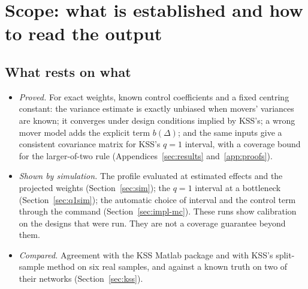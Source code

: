 \section{Scope: what is established and how to read the output}\label{sec:scope}

\subsection{What rests on what}
\begin{itemize}
\item \emph{Proved.} For exact weights, known control coefficients and a fixed centring
constant: the variance estimate is exactly unbiased when movers' variances are known;
it converges under design conditions implied by KSS's; a wrong mover model adds the
explicit term $b(\Delta)$; and the same inputs give a consistent covariance matrix for
KSS's $q=1$ interval, with a coverage bound for the larger-of-two rule
(Appendices~\ref{sec:results} and~\ref{app:proofs}).
\item \emph{Shown by simulation.} The profile evaluated at estimated effects and the
projected weights (Section~\ref{sec:sim}); the $q=1$ interval at a bottleneck
(Section~\ref{sec:q1sim}); the automatic choice of interval and the control term
through the command (Section~\ref{sec:impl-mc}). These runs show calibration on the
designs that were run. They are not a coverage guarantee beyond them.
\item \emph{Compared.} Agreement with the KSS Matlab package and with KSS's
split-sample method on six real samples, and against a known truth on two of their
networks (Section~\ref{sec:kss}).
\end{itemize}


